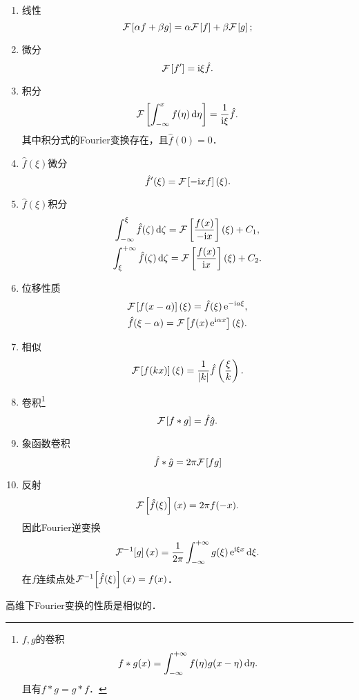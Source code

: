 \begin{enumerate}
	\item 线性
		\[
			\cf{\alpha f+\beta g}=\alpha\cf f+\beta\cf g;
		\]
	\item 微分
		\[
			\cf{f'}=\i\xi\hat f.
		\]
	\item 积分
		\[
			\cf{\int_{-\infty}^xf(\eta)\d\eta}=\frac1{\i\xi}\hat f.
		\]
		其中积分式的Fourier变换存在，且$\hat f(0)=0$．
	\item $\hat f(\xi)$微分
		\[\hat f'(\xi)=\cf{-\i xf}(\xi).\]
	\item $\hat f(\xi)$积分
			\begin{gather}
				\int_{-\infty}^\xi\hat f(\zeta)\d\zeta=\mathcal F\fkh{\frac{f(x)}{-\i x}}(\xi)+C_1,\\
				\int_\xi^{+\infty}\hat f(\zeta)\d\zeta=\mathcal F\fkh{\frac{f(x)}{\i x}}(\xi)+C_2.
			\end{gather}
	\item 位移性质
			\begin{gather*}
				\cf{f(x-a)}(\xi)=\hat f(\xi)\e{-\i a\xi},\\
				\hat f(\xi-\alpha)=\cf{f(x)\e{\i\alpha x}}(\xi).
			\end{gather*}
	\item 相似
			\[\cf{f(kx)}(\xi)=\frac1{\abs k}\hat f\kh{\frac\xi{k}}.\]
	\item 卷积\footnote{$f,g$的卷积\[f\ast g(x)=\int\iti f(\eta)g(x-\eta)\d\eta.\]且有$f\ast g=g\ast f$．}
			\[\cf{f\ast g}=\hat f\hat g.\]
	\item 象函数卷积
			\[\hat f\ast\hat g=2\pi\cf{fg}\]
	\item 反射
			\[\cf{\hat f(\xi)}(x)=2\pi f(-x).\]
			因此Fourier逆变换
			\[\cfi g(x)=\frac1{2\pi}\int\iti g(\xi)\e{\i\xi x}\d\xi.\]
			在$f$连续点处$\cfi{\hat f(\xi)}(x)=f(x)$．
\end{enumerate}
高维下Fourier变换的性质是相似的．
